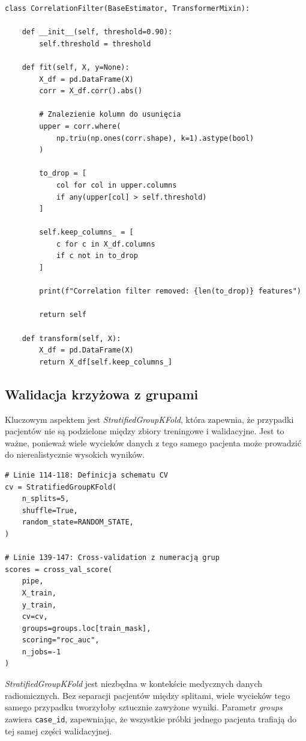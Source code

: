 \documentclass[12pt]{article}
\begin{document}
\begin{lstlisting}[caption={\texttt{src/train.py} (linie 27--60): Klasa CorrelationFilter dla redukcji wymiarowości}]
class CorrelationFilter(BaseEstimator, TransformerMixin):

    def __init__(self, threshold=0.90):
        self.threshold = threshold

    def fit(self, X, y=None):
        X_df = pd.DataFrame(X)
        corr = X_df.corr().abs()

        # Znalezienie kolumn do usunięcia
        upper = corr.where(
            np.triu(np.ones(corr.shape), k=1).astype(bool)
        )

        to_drop = [
            col for col in upper.columns
            if any(upper[col] > self.threshold)
        ]

        self.keep_columns_ = [
            c for c in X_df.columns
            if c not in to_drop
        ]

        print(f"Correlation filter removed: {len(to_drop)} features")

        return self

    def transform(self, X):
        X_df = pd.DataFrame(X)
        return X_df[self.keep_columns_]
\end{lstlisting}

\subsection{Walidacja krzyżowa z grupami}

Kluczowym aspektem jest \textit{StratifiedGroupKFold}, która zapewnia, że przypadki pacjentów nie są podzielone między zbiory treningowe i walidacyjne. Jest to ważne, ponieważ wiele wycieków danych z tego samego pacjenta może prowadzić do nierealistycznie wysokich wyników.

\begin{lstlisting}[caption={\texttt{src/train.py} (linie 114--147): Walidacja krzyżowa z group-aware splitting}]
# Linie 114-118: Definicja schematu CV
cv = StratifiedGroupKFold(
    n_splits=5,
    shuffle=True,
    random_state=RANDOM_STATE,
)

# Linie 139-147: Cross-validation z numeracją grup
scores = cross_val_score(
    pipe,
    X_train,
    y_train,
    cv=cv,
    groups=groups.loc[train_mask],
    scoring="roc_auc",
    n_jobs=-1
)
\end{lstlisting}

\noindent
\begin{tcolorbox}[colframe=purple!75!black, colback=purple!10, title={\large Zapobieganie wyciekom danych}, fonttitle=\bfseries]
\textit{StratifiedGroupKFold} jest niezbędna w kontekście medycznych danych radiomicznych. Bez separacji pacjentów między splitami, wiele wycieków tego samego przypadku tworzyłoby sztucznie zawyżone wyniki. Parametr \textit{groups} zawiera \texttt{case\_id}, zapewniając, że wszystkie próbki jednego pacjenta trafiają do tej samej części walidacyjnej.
\end{tcolorbox}
\end{document}
